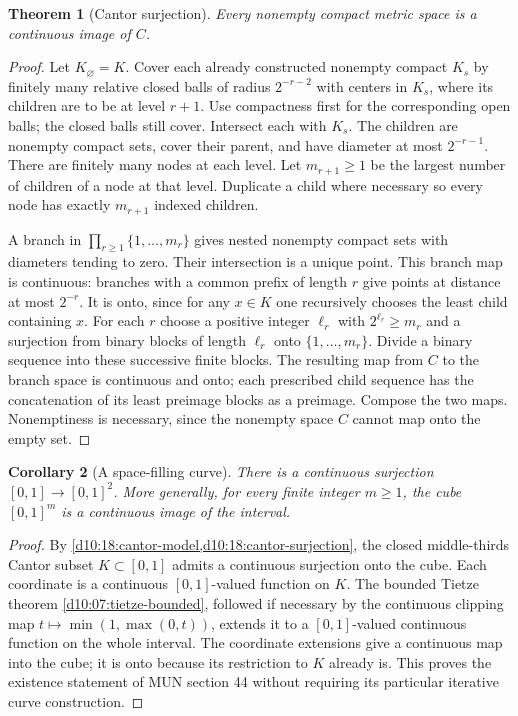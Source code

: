 \documentclass[11pt,oneside,openany]{book}
\newtheorem{theorem}{Theorem}[chapter]
\newtheorem{corollary}[theorem]{Corollary}
\theoremstyle{definition}
\theoremstyle{remark}
\begin{document}
\begin{theorem}[Cantor surjection]\label{d10:18:cantor-surjection}
Every nonempty compact metric space is a continuous image of $C$.
\end{theorem}
\begin{proof}
Let $K_\varnothing=K$. Cover each already constructed nonempty compact
$K_s$ by finitely many relative closed balls of radius $2^{-r-2}$
with centers in $K_s$, where its children are to be at level $r+1$.
Use compactness first for the corresponding open balls; the closed
balls still cover. Intersect each with $K_s$. The children are
nonempty compact sets, cover their parent, and have diameter at
most $2^{-r-1}$. There are finitely many nodes at each level.
Let $m_{r+1}\geq1$ be the largest number of children of a node at
that level. Duplicate a child where necessary so every node has
exactly $m_{r+1}$ indexed children.

A branch in $\prod_{r\geq1}\{1,\ldots,m_r\}$ gives nested nonempty
compact sets with diameters tending to zero. Their intersection is
a unique point. This branch map is continuous: branches with a
common prefix of length $r$ give points at distance at most $2^{-r}$.
It is onto, since for any $x\in K$ one recursively chooses the
least child containing $x$.
For each $r$ choose a positive integer $\ell_r$ with
$2^{\ell_r}\geq m_r$ and a surjection from binary blocks of length
$\ell_r$ onto $\{1,\ldots,m_r\}$. Divide a binary sequence into these
successive finite blocks. The resulting map from $C$ to the branch
space is continuous and onto; each prescribed child sequence has
the concatenation of its least preimage blocks as a preimage.
Compose the two maps. Nonemptiness is necessary, since the
nonempty space $C$ cannot map onto the empty set.
\end{proof}

\begin{corollary}[A space-filling curve]\label{d10:18:peano}
There is a continuous surjection $[0,1]\to[0,1]^2$.
More generally, for every finite integer $m\geq1$, the cube $[0,1]^m$
is a continuous image of the interval.
\end{corollary}
\begin{proof}
By \cref{d10:18:cantor-model,d10:18:cantor-surjection}, the closed
middle-thirds Cantor subset $K\subset[0,1]$ admits a continuous
surjection onto the cube. Each coordinate is a continuous
$[0,1]$-valued function on $K$. The bounded Tietze theorem
\cref{d10:07:tietze-bounded}, followed if necessary by the continuous
clipping map $t\mapsto\min(1,\max(0,t))$, extends it to a
$[0,1]$-valued continuous function on the whole interval.
The coordinate extensions give a continuous map into the cube;
it is onto because its restriction to $K$ already is.
This proves the existence statement of MUN section 44 without
requiring its particular iterative curve construction.
\end{proof}
\end{document}
